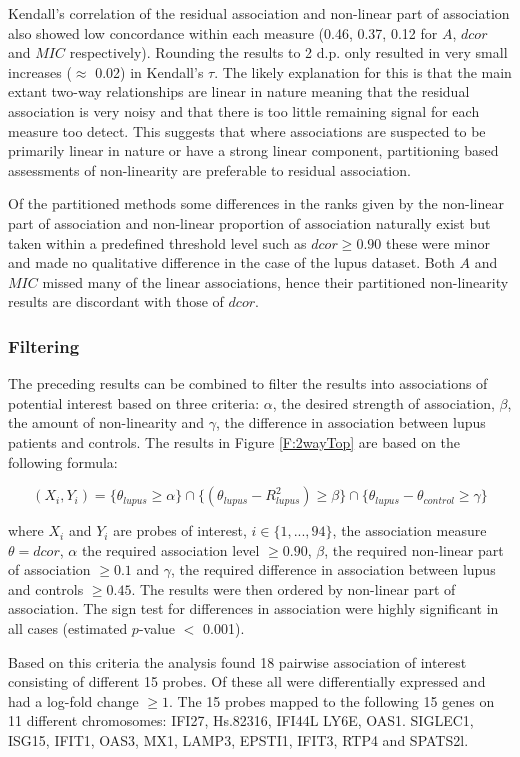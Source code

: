 \documentclass[a4paper, 12pt]{report}
\begin{document}
Kendall's correlation of the residual association and non-linear part of association also showed low concordance within each measure (0.46, 0.37, 0.12 for $A$, $dcor$ and $MIC$ respectively). Rounding the results to 2 d.p. only resulted in very small increases ($\approx$ 0.02) in Kendall's $\tau$. The likely explanation for this is that the main extant two-way relationships are linear in nature meaning that the residual association is very noisy and that there is too little remaining signal for each measure too detect.  This suggests that where associations are suspected to be primarily linear in nature or have a strong linear component, partitioning based assessments of non-linearity are preferable to residual association.

Of the partitioned methods some differences in the ranks given by the non-linear part of association and non-linear proportion of association naturally exist but taken within a predefined threshold level such as $dcor \ge 0.90$ these were minor and made no qualitative difference in the case of the lupus dataset. Both $A$ and $MIC$ missed many of the linear associations, hence their partitioned non-linearity results are discordant with those of $dcor$.

\subsubsection{Filtering}
The preceding results can be combined to filter the results into associations of potential interest based on three criteria: $\alpha$, the desired strength of association, $\beta$, the amount of non-linearity and $\gamma$, the difference in association between lupus patients and controls. The results in Figure \ref{F:2wayTop} are based on the following formula:

\[
(X_i, Y_i) = \{\theta_{lupus} \ge \alpha\} \cap \{(\theta_{lupus} - R^2_{lupus}) \ge \beta \} \cap \{\theta_{lupus} - \theta_{control} \ge \gamma \}
\]

where $X_i$ and $Y_i$ are probes of interest, $i \in \{1, ..., 94\}$, the association measure $\theta = dcor$, $\alpha$ the required association level $\ge 0.90$, $\beta$, the required non-linear part of association $\ge 0.1$ and $\gamma$, the required difference in association between lupus and controls $\ge 0.45$. The results were then ordered by non-linear part of association. The sign test for differences in association were highly significant in all cases (estimated $p$-value $<$ 0.001).

Based on this criteria the analysis found 18 pairwise association of interest consisting of different 15 probes. Of these all were differentially expressed and had a log-fold change $\ge 1$. The 15 probes mapped to the following 15 genes on 11 different chromosomes: IFI27,  Hs.82316, IFI44L   LY6E, OAS1. SIGLEC1, ISG15, IFIT1, OAS3, MX1, LAMP3, EPSTI1, IFIT3, RTP4  and SPATS2l.  
\end{document}
